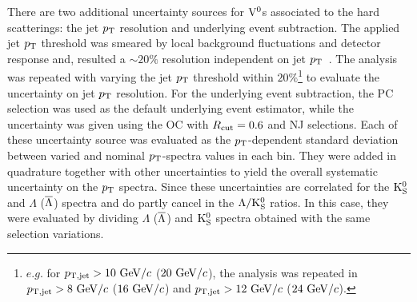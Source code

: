 There are two additional uncertainty sources for ${\rm V}^{0}$s associated to the hard scatterings: the jet $\pT$ resolution and underlying event subtraction.
The applied jet $\pT$ threshold was smeared by local background fluctuations and detector response and, resulted a $\sim 20\%$ resolution independent on jet $\pT$~\cite{Adam:2015hoa}.
The analysis was repeated with varying the jet $\pT$ threshold within $20\%$\footnote{$e.g.$ for $\pT[jet]>10~\GeVc$ ($20~{\rm GeV/}c$), the analysis was repeated in $\pT[jet]>8~\GeVc$ ($16~{\rm GeV/}c$) and $\pT[jet]>12~\GeVc$ ($24~{\rm GeV/}c$).} to evaluate the uncertainty on jet $\pT$ resolution.
For the underlying event subtraction, the PC selection was used as the default underlying event estimator, while the uncertainty was given using the OC with $R_{\rm cut}=0.6$ and NJ selections.
Each of these uncertainty source was evaluated as the $\pT$-dependent standard deviation between varied and nominal $\pT$-spectra values in each bin.
They were added in quadrature together with other uncertainties to yield the overall systematic uncertainty on the $\pT$ spectra.
Since these uncertainties are correlated for the ${\rm K}_{\rm S}^{0}$ and $\Lambda$ ($\overline{\Lambda}$) spectra and do partly cancel in the $\Lambda/{\rm K}_{\rm S}^{0}$ ratios.
In this case, they were evaluated by dividing $\Lambda$ ($\overline{\Lambda}$) and ${\rm K}_{\rm S}^{0}$ spectra obtained with the same selection variations.

